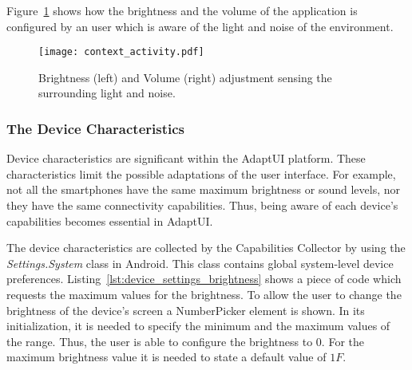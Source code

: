 \inputminted[linenos=true, fontsize=\footnotesize, frame=lines]{java}{4_system_architecture/shared_preferences.java}

\inputminted[linenos=true, fontsize=\footnotesize, frame=lines]{java}{4_system_architecture/shared_preferences_complex.java}

Figure~\ref{fig:context_activity} shows how the brightness and the volume of
the application is configured by an user which is aware of the light and noise
of the environment.

\begin{figure}
\centering
\texttt{[image: context\_activity.pdf]}
\caption{Brightness (left) and Volume (right) adjustment sensing the surrounding
light and noise.}
\label{fig:context_activity}
\end{figure}


\subsubsection{The Device Characteristics}
\label{sec:device_characteristics}

Device characteristics are significant within the AdaptUI platform. These
characteristics limit the possible adaptations of the user interface. For example,
not all the smartphones have the same maximum brightness or sound levels, nor
they have the same connectivity capabilities. Thus, being aware of each device's
capabilities becomes essential in AdaptUI.

The device characteristics are collected by the Capabilities Collector by using
the \textit{Settings.System} class in Android. This class contains global
system-level device preferences. Listing~\ref{lst:device_settings_brightness} 
shows a piece of code which requests the maximum values for the brightness. To 
allow the user to change the brightness of the device's screen a NumberPicker 
element is shown. In its initialization, it is needed to specify the minimum and 
the maximum values of the range. Thus, the user is able to configure the brightness 
to $0$. For the maximum brightness value it is needed to state a default value 
of $1F$.

